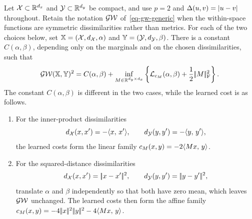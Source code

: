 \begin{prop}\label{prop-gw-euclidean-cost-regularization}
Let $\mathcal{X}\subset\mathbb{R}^{d_x}$ and $\mathcal{Y}\subset\mathbb{R}^{d_y}$ be compact, and use $p=2$ and $\Delta(u,v)=|u-v|$ throughout. Retain the notation $\operatorname{\mathcal{GW}}$ of~\eqref{eq-gw-generic} when the within-space functions are symmetric dissimilarities rather than metrics.
For each of the two choices below, set $\mathbb{X}=(\mathcal{X},d_{\mathcal{X}},\alpha)$ and $\mathbb{Y}=(\mathcal{Y},d_{\mathcal{Y}},\beta)$. There is a constant $C(\alpha,\beta)$, depending only on the marginals and on the chosen dissimilarities, such that
\begin{equation}\label{eq-gw-euclidean-cost-learning}
\operatorname{\mathcal{GW}}(\mathbb{X},\mathbb{Y})^2
=
C(\alpha,\beta)
+
\inf_{M\in\mathbb{R}^{d_y\times d_x}}
\left\{\mathcal{L}_{c_M}(\alpha,\beta)+\frac12|\!| M |\!|_{\mathrm F}^2\right\}.
\end{equation}
The constant $C(\alpha,\beta)$ is different in the two cases, while the learned cost is as follows.
\begin{enumerate}
\item For the inner-product dissimilarities
\begin{equation}\label{eq-gw-inner-product-dissimilarities}
d_{\mathcal{X}}(x,x')=-\langle x,\,x'\rangle,
\qquad
d_{\mathcal{Y}}(y,y')=-\langle y,\,y'\rangle,
\end{equation}
the learned costs form the linear family
$c_M(x,y)=-2\langle Mx,\,y\rangle$.
\item For the squared-distance dissimilarities
\begin{equation}\label{eq-gw-squared-distance-dissimilarities}
d_{\mathcal{X}}(x,x')=|\!| x-x' |\!|^2,
\qquad
d_{\mathcal{Y}}(y,y')=|\!| y-y' |\!|^2,
\end{equation}
translate $\alpha$ and $\beta$ independently so that both have zero mean, which leaves $\operatorname{\mathcal{GW}}$ unchanged. The learned costs then form the affine family
$c_M(x,y)=-4|\!| x |\!|^2|\!| y |\!|^2-4\langle Mx,\,y\rangle$.
\end{enumerate}
\end{prop}
